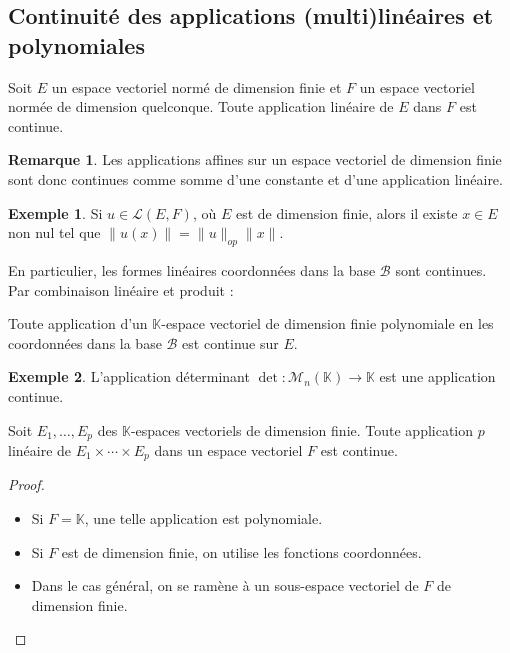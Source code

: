 \documentclass[french]{article}
\newcommand{\K}{\mathbb{K}}
\theoremstyle{plain}
\theoremstyle{definition}
\newtheorem*{ex}{Exemple}
\newtheorem*{rmq}{Remarque}
\theoremstyle{remark}
\begin{document}
\subsection{Continuité des applications (multi)linéaires et polynomiales}

\begin{thm}%
	Soit $E$ un espace vectoriel normé de dimension finie et $F$ un espace vectoriel normée de dimension quelconque. Toute application linéaire de $E$ dans $F$ est continue.
\end{thm}

\begin{rmq}
	Les applications affines sur un espace vectoriel de dimension finie sont donc continues comme somme d'une constante et d'une application linéaire.
\end{rmq}

\begin{ex}
	Si $u\in\mathcal{L}(E,F)$, où $E$ est de dimension finie, alors il existe $x\in E$ non nul tel que $\lVert u(x)\rVert=\lVert u\rVert_{op}\lVert x\rVert$. 
\end{ex}

En particulier, les formes linéaires coordonnées dans la base $\mathcal{B}$ sont continues. Par combinaison linéaire et produit :

\begin{prop}%
	Toute application d'un $\K$-espace vectoriel de dimension finie polynomiale en les coordonnées dans la base $\mathcal{B}$ est continue sur $E$.
\end{prop}

\begin{ex}
	L'application déterminant $\det:\mathcal{M}_n(\K)\to\K$ est une application continue.
\end{ex}

\begin{prop}%
	Soit $E_1,\ldots,E_p$ des $\K$-espaces vectoriels de dimension finie. Toute application $p$ linéaire de $E_1\times\cdots\times E_p$ dans un espace vectoriel $F$ est continue.
\end{prop}
\begin{proof}
	\begin{itemize}
		\item Si $F=\K$, une telle application est polynomiale.
		\item Si $F$ est de dimension finie, on utilise les fonctions coordonnées.
		\item Dans le cas général, on se ramène à un sous-espace vectoriel de $F$ de dimension finie.
	\end{itemize}
\end{proof}
\end{document}
